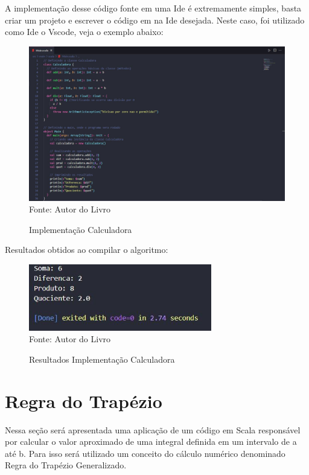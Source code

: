 	A implementação desse código fonte em uma Ide é extremamente simples, basta criar um projeto e escrever o código em na Ide desejada. Neste caso, foi utilizado como Ide o Vscode, veja o exemplo abaixo:
	
	\begin{figure}[H]
		\centering
		\caption{Implementação Calculadora}
		\label{Implementação Calculadora}
		\includegraphics[width=17cm]{Pictures/Calc.jpg} \\
		Fonte: Autor do Livro
	\end{figure}

	Resultados obtidos ao compilar o algoritmo: 
	
	\begin{figure}[H]
		\centering
		\caption{Resultados Implementação Calculadora}
		\label{Resultados Implementação Calculadora}
		\includegraphics[width=8cm]{Pictures/ResCalc.jpg} \\
		Fonte: Autor do Livro
	\end{figure}
    
    \section{Regra do Trapézio}
    Nessa seção será apresentada uma aplicação de um código em Scala responsável por calcular o valor aproximado de uma integral definida em um intervalo de a até b. Para isso será utilizado um conceito do cálculo numérico denominado Regra do Trapézio Generalizado.
    

